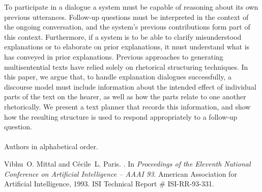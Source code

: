\begin{thebibliography}{10}
{\leftskip=0.1in\rightskip=0.1in\begin{small}\par{}To
  participate in a dialogue a system must be capable of reasoning about its own
  previous utterances. Follow-up questions must be interpreted in the context
  of the ongoing conversation, and the system's previous contributions form
  part of this context. Furthermore, if a system is to be able to clarify
  misunderstood explanations or to elaborate on prior explanations, it must
  understand what is has conveyed in prior explanations. Previous approaches to
  generating multisentential texts have relied solely on rhetorical structuring
  techniques. In this paper, we argue that, to handle explanation dialogues
  successfully, a discourse model must include information about the intended
  effect of individual parts of the text on the hearer, as well as how the
  parts relate to one another rhetorically. We present a text planner that
  records this information, and show how the resulting structure is used to
  respond appropriately to a follow-up question.\\ \\ Authors in alphabetical
  order.\end{small}\par}
\noindent\hspace*{\itemindent}{\leftskip=0.1in\rightskip=0.1in\hrulefill}

Vibhu~O. Mittal and C{\'e}cile~L. Paris.
.
\newblock In {\em Proceedings of the {\it Eleventh National Conference on
  Artificial Intelligence -- AAAI 93\/}}. American Association for Artificial
  Intelligence, 1993.
\newblock ISI Technical Report \# ISI-RR-93-331.


\end{thebibliography}
